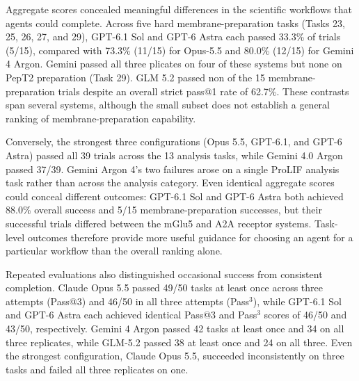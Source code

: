 \documentclass[twoside,twocolumn,9pt]{article}
\begin{document}


Aggregate scores concealed meaningful differences in the scientific workflows that agents could complete. Across five hard membrane-preparation tasks (Tasks 23, 25, 26, 27, and 29), GPT-6.1 Sol and GPT-6 Astra each passed 33.3\% of trials (5/15), compared with 73.3\% (11/15) for Opus-5.5 and 80.0\% (12/15) for Gemini 4 Argon. Gemini passed all three plicates on four of these systems but none on PepT2 preparation (Task 29). GLM 5.2 passed non of the 15 membrane-preparation trials despite an overall strict pass@1 rate of 62.7\%. These contrasts span several systems, although the small subset does not establish a general ranking of membrane-preparation capability. 

Conversely, the strongest three configurations (Opus 5.5, GPT-6.1, and GPT-6 Astra) passed all 39 trials across the 13 analysis tasks, while Gemini 4.0 Argon passed 37/39. Gemini Argon 4's two failures arose on a single ProLIF analysis task rather than across the analysis category. Even identical aggregate scores could conceal different outcomes: GPT-6.1 Sol and GPT-6 Astra both achieved 88.0\% overall success and 5/15 membrane-preparation successes, but their successful trials differed between the mGlu5 and A2A receptor systems. Task-level outcomes therefore provide more useful guidance for choosing an agent for a particular workflow than the overall ranking alone.  

Repeated evaluations also distinguished occasional success from consistent completion. Claude Opus 5.5 passed 49/50 tasks at least once across three attempts (Pass@3) and 46/50 in all three attempts (Pass$^3$), while GPT-6.1 Sol and GPT-6 Astra each achieved identical Pass@3 and Pass$^3$ scores of 46/50 and 43/50, respectively. Gemini 4 Argon passed 42 tasks at least once and 34 on all three replicates, while GLM-5.2 passed 38 at least once and 24 on all three. Even the strongest configuration, Claude Opus 5.5, succeeded inconsistently on three tasks and failed all three replicates on one. 
\end{document}
